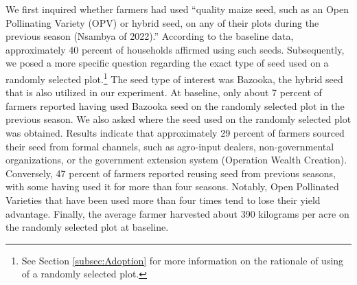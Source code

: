 \documentclass[english]{article}\usepackage[]{graphicx}\usepackage[]{xcolor}
\begin{document}
We first inquired whether farmers had used “quality maize seed, such
as an Open Pollinating Variety (OPV) or hybrid seed, on any of their
plots during the previous season (Nsambya of 2022).” According to
the baseline data, approximately 40 percent of households affirmed
using such seeds. Subsequently, we posed a more specific question
regarding the exact type of seed used on a randomly selected plot.\footnote{See Section \ref{subsec:Adoption} for more information on the rationale
of using of a randomly selected plot.} The seed type of interest was Bazooka, the hybrid seed that is also
utilized in our experiment. At baseline, only about 7 percent of farmers
reported having used Bazooka seed on the randomly selected plot in
the previous season. We also asked where the seed used on the randomly
selected plot was obtained. Results indicate that approximately 29
percent of farmers sourced their seed from formal channels, such as
agro-input dealers, non-governmental organizations, or the government
extension system (Operation Wealth Creation). Conversely, 47 percent
of farmers reported reusing seed from previous seasons, with some
having used it for more than four seasons. Notably, Open Pollinated
Varieties that have been used more than four times tend to lose their
yield advantage. Finally, the average farmer harvested about 390 kilograms
per acre on the randomly selected plot at baseline. 
\end{document}
